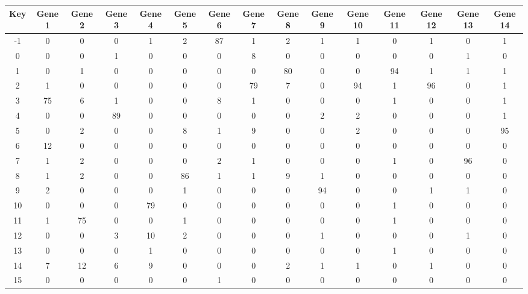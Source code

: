 \begin{tabular}{|c|c|c|c|c|c|c|c|c|c|c|c|c|c|c|}
\hline
Key & Gene 1 & Gene 2 & Gene 3 & Gene 4 & Gene 5 & Gene 6 & Gene 7 & Gene 8 & Gene 9 & Gene 10 & Gene 11 & Gene 12 & Gene 13 & Gene 14 \\
\hline
-1 & 0 & 0 & 0 & 1 & 2 & 87 & 1 & 2 & 1 & 1 & 0 & 1 & 0 & 1 \\
0 & 0 & 0 & 1 & 0 & 0 & 0 & 8 & 0 & 0 & 0 & 0 & 0 & 1 & 0 \\
1 & 0 & 1 & 0 & 0 & 0 & 0 & 0 & 80 & 0 & 0 & 94 & 1 & 1 & 1 \\
2 & 1 & 0 & 0 & 0 & 0 & 0 & 79 & 7 & 0 & 94 & 1 & 96 & 0 & 1 \\
3 & 75 & 6 & 1 & 0 & 0 & 8 & 1 & 0 & 0 & 0 & 1 & 0 & 0 & 1 \\
4 & 0 & 0 & 89 & 0 & 0 & 0 & 0 & 0 & 2 & 2 & 0 & 0 & 0 & 1 \\
5 & 0 & 2 & 0 & 0 & 8 & 1 & 9 & 0 & 0 & 2 & 0 & 0 & 0 & 95 \\
6 & 12 & 0 & 0 & 0 & 0 & 0 & 0 & 0 & 0 & 0 & 0 & 0 & 0 & 0 \\
7 & 1 & 2 & 0 & 0 & 0 & 2 & 1 & 0 & 0 & 0 & 1 & 0 & 96 & 0 \\
8 & 1 & 2 & 0 & 0 & 86 & 1 & 1 & 9 & 1 & 0 & 0 & 0 & 0 & 0 \\
9 & 2 & 0 & 0 & 0 & 1 & 0 & 0 & 0 & 94 & 0 & 0 & 1 & 1 & 0 \\
10 & 0 & 0 & 0 & 79 & 0 & 0 & 0 & 0 & 0 & 0 & 1 & 0 & 0 & 0 \\
11 & 1 & 75 & 0 & 0 & 1 & 0 & 0 & 0 & 0 & 0 & 1 & 0 & 0 & 0 \\
12 & 0 & 0 & 3 & 10 & 2 & 0 & 0 & 0 & 1 & 0 & 0 & 0 & 1 & 0 \\
13 & 0 & 0 & 0 & 1 & 0 & 0 & 0 & 0 & 0 & 0 & 1 & 0 & 0 & 0 \\
14 & 7 & 12 & 6 & 9 & 0 & 0 & 0 & 2 & 1 & 1 & 0 & 1 & 0 & 0 \\
15 & 0 & 0 & 0 & 0 & 0 & 1 & 0 & 0 & 0 & 0 & 0 & 0 & 0 & 0 \\
\hline
\end{tabular}